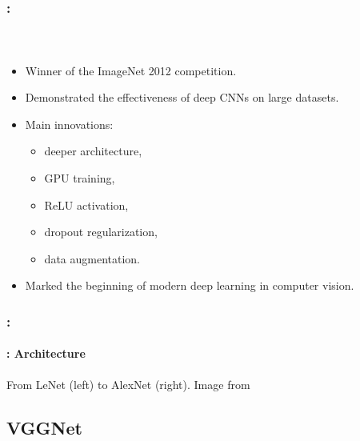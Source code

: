 \documentclass[xcolor=table]{beamer}
\begin{document}
\begin{frame}
	\frametitle{\insertshortsubtitle: \insertsection}
	\framesubtitle{\insertsubsection\ \cite{2012-krizhevsky-al}}
	
	\begin{itemize}
		
		\item Winner of the ImageNet 2012 competition.
		
		\item Demonstrated the effectiveness of deep CNNs on large datasets.
		
		\item Main innovations:
		\begin{itemize}
			\item deeper architecture,
			\item GPU training,
			\item ReLU activation,
			\item dropout regularization,
			\item data augmentation.
		\end{itemize}
		
		\item Marked the beginning of modern deep learning in computer vision.
		
	\end{itemize}
	
\end{frame}

\begin{frame}
	\frametitle{\insertshortsubtitle: \insertsection}
	\framesubtitle{\insertsubsection: Architecture}
	
	\begin{center}
		
		From LeNet (left) to AlexNet (right). Image from \cite{d2l}
	\end{center}
	
\end{frame}

\subsection{VGGNet}
\end{document}
